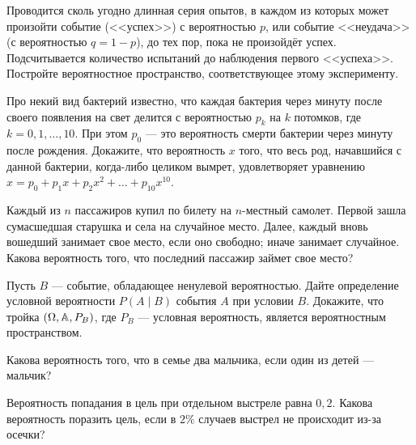 \documentclass[a4paper,12pt]{article}
\begin{document}
    Проводится сколь угодно длинная серия опытов, в каждом из которых может произойти событие (<<успех>>) с вероятностью $p$, или событие <<неудача>> (с вероятностью $q=1-p$), до тех пор, пока не произойдёт успех.
    Подсчитывается количество испытаний до наблюдения первого <<успеха>>.
    Постройте вероятностное пространство, соответствующее этому эксперименту.

Про некий вид бактерий известно,
что каждая бактерия через минуту после своего появления
на свет делится с вероятностью $p_k$ на $k$ потомков, где $k=0,1,\dots,10$.
При этом $p_0$ --- это вероятность смерти
бактерии через минуту после рождения.
Докажите, что вероятность $x$ того, что весь род, начавшийся с данной
бактерии,  когда-либо целиком вымрет, удовлетворяет уравнению
$x=p_0+p_1x+p_2x^2+\dots+p_{10}x^{10}$.



Каждый из $n$ пассажиров купил по билету на $n$-местный самолет.
Первой зашла сумасшедшая старушка и села на случайное место.
Далее, каждый вновь вошедший занимает свое место, если оно свободно;
иначе занимает случайное. Какова вероятность того,
что последний пассажир займет свое место?



\newpage



    Пусть $B$ --- событие, обладающее ненулевой вероятностью.
        Дайте определение условной вероятности $P(A\mid B)$ события $A$ при условии $B$.
        Докажите, что тройка $(\Omega, \mathbb{A}, P_B)$, где $P_B$ --- условная вероятность, является вероятностным пространством.

    Какова вероятность того, что в семье два мальчика, если один из детей --- мальчик?

    Вероятность попадания в цель при отдельном выстреле равна $0{,}2$.
    Какова вероятность поразить цель, если в $2\%$ случаев выстрел не происходит из-за осечки?
\end{document}
